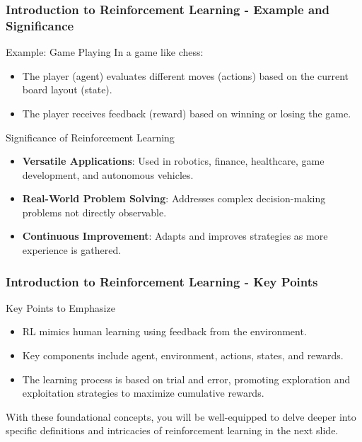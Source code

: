 \documentclass[aspectratio=169]{beamer}
\begin{document}
\begin{frame}[fragile]
  \frametitle{Introduction to Reinforcement Learning - Example and Significance}
  \begin{block}{Example: Game Playing}
    In a game like chess:
    \begin{itemize}
      \item The player (agent) evaluates different moves (actions) based on the current board layout (state).
      \item The player receives feedback (reward) based on winning or losing the game.
    \end{itemize}
  \end{block}

  \begin{block}{Significance of Reinforcement Learning}
    \begin{itemize}
      \item \textbf{Versatile Applications}: Used in robotics, finance, healthcare, game development, and autonomous vehicles.
      \item \textbf{Real-World Problem Solving}: Addresses complex decision-making problems not directly observable.
      \item \textbf{Continuous Improvement}: Adapts and improves strategies as more experience is gathered.
    \end{itemize}
  \end{block}
\end{frame}

\begin{frame}[fragile]
  \frametitle{Introduction to Reinforcement Learning - Key Points}
  \begin{block}{Key Points to Emphasize}
    \begin{itemize}
      \item RL mimics human learning using feedback from the environment.
      \item Key components include agent, environment, actions, states, and rewards.
      \item The learning process is based on trial and error, promoting exploration and exploitation strategies to maximize cumulative rewards.
    \end{itemize}
  \end{block}
  With these foundational concepts, you will be well-equipped to delve deeper into specific definitions and intricacies of reinforcement learning in the next slide.
\end{frame}
\end{document}
